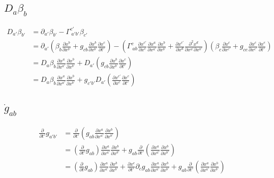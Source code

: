 \documentclass{article}
\begin{document}
\subsection{$D_{a}\beta_{b}$}
\begin{align*}
D_{a'}\beta_{b'} & = \partial_{a'}\beta_{b'} - \Gamma^{c'}_{~a'b'}\beta_{c'}\\
& = \partial_{a'}(\beta_{b}\frac{\partial x^{b}}{\partial x^{b'}} + g_{cb}\frac{\partial x^{b}}{\partial x^{b'}}\frac{\partial x^{c}}{\partial t'}) - (\Gamma^{c}_{~ab}\frac{\partial x^{c'}}{\partial x^{c}}\frac{\partial x^{a}}{\partial x^{a'}}\frac{\partial x^{b}}{\partial x^{b'}} + \frac{\partial x^{c'}}{\partial x^{d}}\frac{\partial^2 x^{d}}{\partial x^{a'}\partial x^{b'}})(\beta_{c}\frac{\partial x^{c}}{\partial x^{c'}} + g_{ce}\frac{\partial x^{c}}{\partial x^{c'}}\frac{\partial x^{e}}{\partial t'})\\
& = D_{a}\beta_{b}\frac{\partial x^{a}}{\partial x^{a'}}\frac{\partial x^{b}}{\partial x^{b'}} + D_{a'}(g_{cb}\frac{\partial x^{b}}{\partial x^{b'}}\frac{\partial x^{c}}{\partial t'})\\
& = D_{a}\beta_{b}\frac{\partial x^{a}}{\partial x^{a'}}\frac{\partial x^{b}}{\partial x^{b'}} + g_{c'b'}D_{a'}(\frac{\partial x^{c'}}{\partial x^{c}}\frac{\partial x^{c}}{\partial t'})
\end{align*}
\subsection{${\dot g_{ab}}$}
\begin{align*}
\frac{\partial}{\partial t'}g_{a'b'} & = \frac{\partial}{\partial {t'}}(g_{ab}\frac{\partial x^{a}}{\partial x^{a'}}\frac{\partial x^{b}}{\partial x^{b'}})\\
& = (\frac{\partial}{\partial t'}g_{ab})\frac{\partial x^{a}}{\partial x^{a'}}\frac{\partial x^{b}}{\partial x^{b'}} + g_{ab}\frac{\partial}{\partial t'}(\frac{\partial x^{a}}{\partial x^{a'}}\frac{\partial x^{b}}{\partial x^{b'}})\\
& = (\frac{\partial}{\partial t}g_{ab})\frac{\partial x^{a}}{\partial x^{a'}}\frac{\partial x^{b}}{\partial x^{b'}} + \frac{\partial x^{c}}{\partial t'}\partial_{c}g_{ab}\frac{\partial x^{a}}{\partial x^{a'}}\frac{\partial x^{b}}{\partial x^{b'}} + g_{ab}\frac{\partial}{\partial t'}(\frac{\partial x^{a}}{\partial x^{a'}}\frac{\partial x^{b}}{\partial x^{b'}})
\end{align*}
\end{document}
